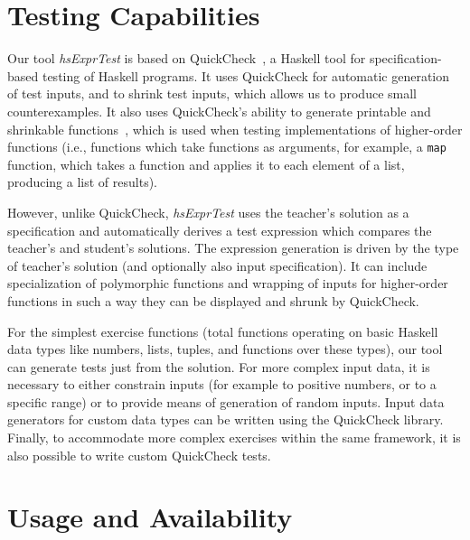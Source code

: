 \documentclass[sigconf]{acmart} %
\newcommand{\hsExprTest}{\textit{hsExprTest}}
\begin{document}


\maketitle

\section{Testing Capabilities}

Our tool \hsExprTest{} is based on QuickCheck~\cite{Koen2000}, a Haskell tool for
specification-based testing of Haskell programs.
It uses QuickCheck for automatic generation of test inputs, and to shrink test
inputs, which allows us to produce small counterexamples.
It also uses QuickCheck's ability to generate printable and shrinkable
functions~\cite{Koen2012}, which is used when testing implementations of
higher-order functions (i.e., functions which take functions as arguments, for
example, a \texttt{map} function, which takes a function and applies it to each
element of a list, producing a list of results).

However, unlike QuickCheck, \hsExprTest{} uses the teacher's solution as a
specification and automatically derives a test expression which compares the
teacher's and student's solutions.
The expression generation is driven by the type of teacher's solution (and
optionally also input specification).
It can include specialization of
polymorphic functions and wrapping of inputs for higher-order functions in such
a way they can be displayed and shrunk by QuickCheck.

For the simplest exercise functions (total functions operating on basic
Haskell data types like numbers, lists, tuples, and functions over these
types), our tool can generate tests just from the solution.
For more complex input data, it is necessary to either constrain inputs
(for example to positive numbers, or to a specific range) or to provide means
of generation of random inputs.
Input data generators for custom data types can be written using the QuickCheck
library.
Finally, to accommodate more complex exercises within the same framework, it is
also possible to write custom QuickCheck tests.

\section{Usage and Availability}
\end{document}
